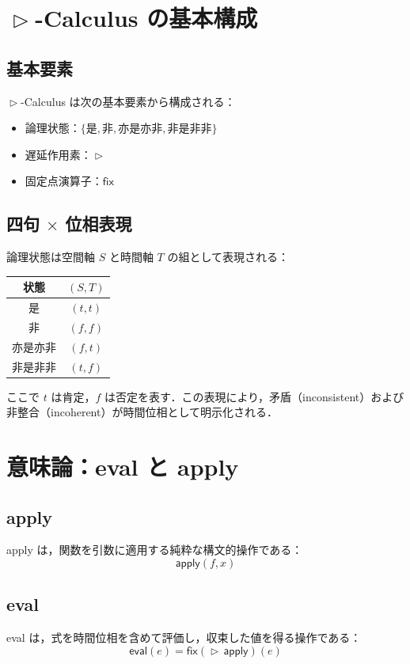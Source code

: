 \documentclass[uplatex,12pt,a4paper]{jsarticle}
\newcommand{\delay}{\mathrel{\triangleright}}
\begin{document}
\section{$\delay$-Calculus の基本構成}

\subsection{基本要素}
$\delay$-Calculus は次の基本要素から構成される：
\begin{itemize}
\item 論理状態：$\{ \text{是}, \text{非}, \text{亦是亦非}, \text{非是非非} \}$
\item 遅延作用素：$\delay$
\item 固定点演算子：$\mathsf{fix}$
\end{itemize}

\subsection{四句 $\times$ 位相表現}
論理状態は空間軸 $S$ と時間軸 $T$ の組として表現される：

\begin{center}
\begin{tabular}{c|c}
状態 & $(S,T)$ \\
\hline
是 & $(t,t)$ \\
非 & $(f,f)$ \\
亦是亦非 & $(f,t)$ \\
非是非非 & $(t,f)$ \\
\end{tabular}
\end{center}

ここで $t$ は肯定，$f$ は否定を表す．この表現により，矛盾（inconsistent）および非整合（incoherent）が時間位相として明示化される．

\section{意味論：eval と apply}

\subsection{apply}
apply は，関数を引数に適用する純粋な構文的操作である：
\begin{equation}
\mathsf{apply}(f, x)
\end{equation}

\subsection{eval}
eval は，式を時間位相を含めて評価し，収束した値を得る操作である：
\begin{equation}
\mathsf{eval}(e)
  = \mathsf{fix}(\delay \,\mathsf{apply})(e)
\end{equation}
\end{document}
